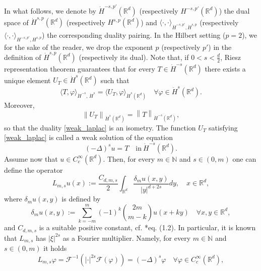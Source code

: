 \documentclass[letterpaper, 11pt,  reqno]{amsart}
\theoremstyle{definition}
\theoremstyle{remark}
\numberwithin{equation}{section}
\newcommand{\bbr}{\mathbb{R}}
\newcommand{\N}{{\mathbb N}}
\newcommand{\R}{{\mathbb R}}
\begin{document}
In what follows, we denote by $\dot H^{-s,p'}(\R^d)$ (respectively $H^{-s,p'}(\R^d)$) the dual space of $\dot H^{s,p}(\R^d)$ (respectively $H^{s,p}(\R^d)$) and $\langle \cdot, \cdot \rangle_{\dot{H}^{-s,p'}\!,\dot{H}^{s,p}}$ (respectively $\langle \cdot, \cdot \rangle_{{H}^{-s,p'}\!,{H}^{s,p}}$) the corresponding duality pairing. In the Hilbert setting ($p=2$), we for the sake of the reader, we drop the exponent $p$ (respectively $p'$) in the definition of $\dot H^{s,p}(\R^d)$ (respectively its dual).
 Note that, if $0<s<\frac{d}{2}$, Riesz representation theorem guarantees that for every $T\in \dot{H}^{-s}(\bbr^d)$  there exists a unique element ${U}_{T}\in \dot{H}^{s}(\bbr^d)$ such that 
\begin{equation}\label{weak_laplac}
	\langle T,\varphi \rangle_{\dot{H}^{-s}, \,\dot{H}^s}=\langle {U}_T, \varphi \rangle_{\dot{H}^{s}(\bbr^d)}\quad  \forall \varphi\in \dot{H}^{s}(\bbr^d).
\end{equation}
 Moreover, 
\begin{equation}\label{nomr_4}
	\left\|{U}_T\right\|_{\dot{H}^{s}(\bbr^d)}=\left\|T\right\|_{\dot{H}^{-s}(\bbr^d)},
\end{equation}
so that the duality \eqref{weak_laplac} is an isometry. 
The function ${U}_T$ satisfying \eqref{weak_laplac} is called a weak solution of the equation 
\begin{equation}\label{weak_10}
	(-\Delta)^{s}u=T \quad \text{in}\  \dot{H}^{-s}(\bbr^d).
\end{equation}
	\indent Assume now that $u\in C^{\infty}_c(\R^d)$. Then, for every $m\in \N$ and $s\in (0,m)$ one can define the operator	
	\begin{equation}\label{L}
		L_{m,s}u(x):=\frac{C_{d,m,s}}{2}\int_{\R^d}\frac{\delta_{m}u(x,y)}{|y|^{d+2s}}dy, \quad x\in \R^d,
	\end{equation}
	where $\delta_m u(x,y)$ is defined by 
	\begin{equation}\label{sigma}
		\delta_m u(x,y):=\sum_{k=-m}^{m}(-1)^{k}\binom{2m}{m-k}u(x+ky)\quad \forall x,y\in \R^d,
	\end{equation}
	and   $C_{d,m,s}$ is a suitable positive constant, cf. \cite{Abatangelo_2}*{eq. (1.2)}.
In particular, it is known that
	$L_{m,s}$ has $|\xi|^{2s}$ as a Fourier multiplier. Namely, for every $m\in \N$ and $s\in (0,m)$ it holds
	\begin{equation}\label{fourier_L}
		L_{m,s}\varphi=\mathscr{F}^{-1}\left({|\cdot|}^{2s}\mathscr{F}(\varphi)\right)=	(-\Delta)^{s}\varphi\quad  \forall \varphi\in C^{\infty}_c(\R^d),
	\end{equation}
\end{document}
